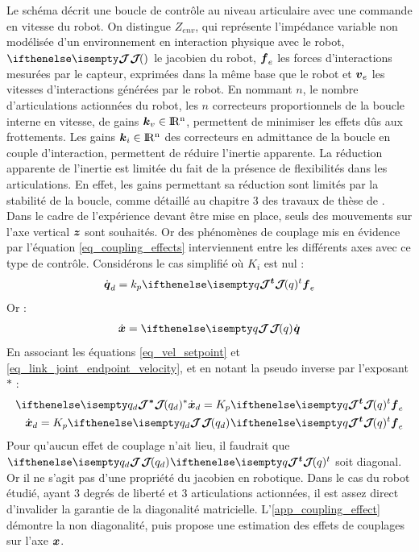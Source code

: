 \documentclass[12pt, a4paper]{article} %
\numberwithin{equation}{section}
\begin{document}
Le schéma décrit une boucle de contrôle au niveau articulaire avec une commande en vitesse du robot. On distingue $Z_{env}$, qui représente l'impédance variable non modélisée d'un environnement en interaction physique avec le robot, $\jacobian{}{}{}$ le jacobien du robot, $\vect{f}_e$ les forces d'interactions mesurées par le capteur, exprimées dans la même base que le robot et $\vect{v}_e$ les vitesses d'interactions générées par le robot. En nommant $ n $, le nombre d'articulations actionnées du robot, les $ n $ correcteurs proportionnels de la boucle interne en vitesse, de gains $ \vect{K}_v \in \R^n $,  permettent de minimiser les effets dûs aux frottements. Les gains $ \vect{K}_i \in \R^n $ des correcteurs en admittance de la boucle en couple d'interaction, permettent de réduire l'inertie apparente.
%
\newlineBlank
%
La réduction apparente de l'inertie est limitée du fait de la présence de flexibilités dans les articulations. En effet, les gains permettant sa réduction sont limités par la stabilité de la boucle, comme détaillé au chapitre 3 des travaux de thèse de \cite{lamy_conception_2011}.
%
\newlineBlank 
%
Dans le cadre de l'expérience devant être mise en place, seuls des mouvements sur l'axe vertical $\vect{z}$ sont souhaités. Or des phénomènes de couplage mis en évidence par l'équation \cref{eq_coupling_effects} interviennent entre les différents axes avec ce type de contrôle.
%
\newlineBlank
%
Considérons le cas simplifié où $K_i$ est nul :
%
\begin{equation} \label{eq_vel_setpoint}
	\begin{split}
	\dot{\vect{q}}_d = k_p \jacobian{q}{}{t} \vect{F}_e
	\end{split}
\end{equation}
%
Or :
%
\begin{equation} \label{eq_link_joint_endpoint_velocity}
	\begin{split}
	\dot{\vect{X}} = \jacobian{q}{}{} \dot{\vect{q}}
	\end{split}
\end{equation}
%
En associant les équations \cref{eq_vel_setpoint} et \cref{eq_link_joint_endpoint_velocity}, et en notant la pseudo inverse par l'exposant $*$ :
\begin{equation} \label{eq_coupling_effects}
	\begin{split}
	\jacobian{q_d}{}{*} \dot{\vect{X}}_d = K_p \jacobian{q}{}{t} \vect{F}_e \\	
	\dot{\vect{X}}_d = K_p \jacobian{q_d}{}{} \jacobian{q}{}{t} \vect{F}_e
	\end{split}
\end{equation}
%
Pour qu'aucun effet de couplage n'ait lieu, il faudrait que $ \jacobian{q_d}{}{} \jacobian{q}{}{t} $ soit diagonal. Or il ne s'agit pas d'une propriété du jacobien en robotique. Dans le cas du robot étudié, ayant 3 degrés de liberté et 3 articulations actionnées, il est assez direct d'invalider la garantie de la diagonalité matricielle. L'\cref{app_coupling_effect} démontre la non diagonalité, puis propose une estimation des effets de couplages sur l'axe $ \vect{x} $.
\end{document}
